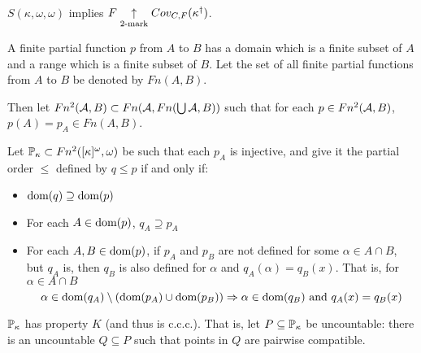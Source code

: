  \begin{corollary}
    $S(\kappa,\omega,\omega)$ implies $F\underset{2\text{-mark}}{\uparrow}Cov_{C,F}(\kappa^\dagger)$.
  \end{corollary}

  \begin{definition}
    A finite partial function $p$ from $A$ to $B$ has a domain which is a finite subset of $A$ and a range which is a finite subset of $B$. Let the set of all finite partial functions from $A$ to $B$ be denoted by $Fn(A,B)$.

    Then let $Fn^2(\mathcal{A},B)\subset Fn(\mathcal{A},Fn(\bigcup \mathcal{A},B))$ such that for each $p\in Fn^2(\mathcal{A},B)$, $p(A)=p_A\in Fn(A,B)$.
  \end{definition}

  \begin{definition}
    Let $\mathbb{P}_\kappa\subset Fn^2([\kappa]^\omega,\omega)$ be such that each $p_A$ is injective, and give it the partial order $\leq$ defined by $q\leq p$ if and only if:
          \begin{itemize}
            \item $\textrm{dom}(q)\supseteq\textrm{dom}(p)$
            \item For each $A\in\textrm{dom}(p)$, $q_A\supseteq p_A$
            \item For each $A,B\in\textrm{dom}(p)$, if $p_A$ and $p_B$ are not defined for some $\alpha\in A\cap B$, but $q_A$ is, then $q_B$ is also defined for $\alpha$ and $q_A(\alpha)=q_B(x)$. That is, for $\alpha\in A\cap B$ 
              \[
                \alpha\in\textrm{dom}(q_A)\setminus(\textrm{dom}(p_A)\cup\textrm{dom}(p_B))
                \Rightarrow
                \alpha\in\textrm{dom}(q_B) \text{ and } q_A(x)=q_B(x)
              \]
          \end{itemize}
  \end{definition}

  \begin{lemma}
    $\mathbb{P}_\kappa$ has property $K$ (and thus is c.c.c.). That is, let $P\subseteq\mathbb{P}_\kappa$ be uncountable: there is an uncountable $Q\subseteq P$ such that points in $Q$ are pairwise compatible.
  \end{lemma}

